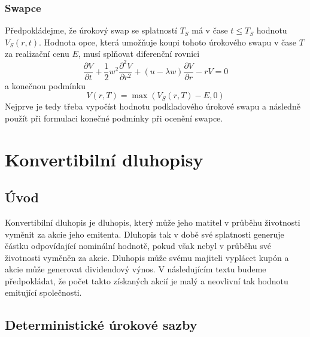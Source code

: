 \documentclass[a4paper]{book}
\begin{document}
\subsection{Swapce}

Předpokládejme, že úrokový swap se splatností $T_S$ má v čase $t \le T_S$ hodnotu $V_S(r,t)$. Hodnota opce, která umožňuje koupi tohoto úrokového swapu v čase $T$ za realizační cenu $E$, musí splňovat diferenční rovnici
\begin{equation*}
\frac{\partial V}{\partial t} + \frac{1}{2}w^2 \frac{\partial^2 V}{\partial r^2} + (u - \lambda w) \frac{\partial V}{\partial r} - rV = 0
\end{equation*}
a konečnou podmínku
\begin{equation*}
V(r,T) = \max(V_S(r,T) - E, 0)
\end{equation*}
Nejprve je tedy třeba vypočíst hodnotu podkladového úrokové swapu a následně použít při formulaci konečné podmínky při ocenění swapce.

\chapter{Konvertibilní dluhopisy}

\section{Úvod}

Konvertibilní dluhopis je dluhopis, který může jeho matitel v průběhu životnosti vyměnit za akcie jeho emitenta. Dluhopis tak v době své splatnosti generuje částku odpovídající nominální hodnotě, pokud však nebyl v průběhu své životnosti vyměněn za akcie. Dluhopis může svému majiteli vyplácet kupón a akcie může generovat dividendový výnos. V následujícím textu budeme předpokládat, že počet takto získaných akcií je malý a neovlivní tak hodnotu emitující společnosti.

\section{Deterministické úrokové sazby}
\end{document}
